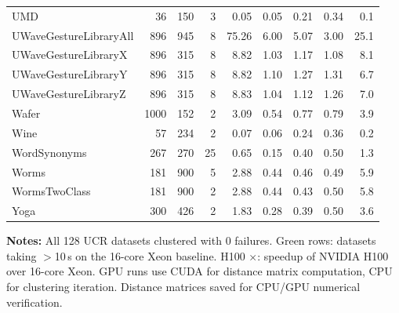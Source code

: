 \documentclass[11pt,landscape]{article}
\begin{document}
\begin{longtable}{lrrrrrrrr}
UMD & 36 & 150 & 3 & 0.05 & 0.05 & 0.21 & 0.34 & 0.1 \\
\rowcolor{fastrow}UWaveGestureLibraryAll & 896 & 945 & 8 & 75.26 & 6.00 & 5.07 & 3.00 & 25.1 \\
UWaveGestureLibraryX & 896 & 315 & 8 & 8.82 & 1.03 & 1.17 & 1.08 & 8.1 \\
UWaveGestureLibraryY & 896 & 315 & 8 & 8.82 & 1.10 & 1.27 & 1.31 & 6.7 \\
UWaveGestureLibraryZ & 896 & 315 & 8 & 8.83 & 1.04 & 1.12 & 1.26 & 7.0 \\
Wafer & 1000 & 152 & 2 & 3.09 & 0.54 & 0.77 & 0.79 & 3.9 \\
Wine & 57 & 234 & 2 & 0.07 & 0.06 & 0.24 & 0.36 & 0.2 \\
WordSynonyms & 267 & 270 & 25 & 0.65 & 0.15 & 0.40 & 0.50 & 1.3 \\
Worms & 181 & 900 & 5 & 2.88 & 0.44 & 0.46 & 0.49 & 5.9 \\
WormsTwoClass & 181 & 900 & 2 & 2.88 & 0.44 & 0.43 & 0.50 & 5.8 \\
Yoga & 300 & 426 & 2 & 1.83 & 0.28 & 0.39 & 0.50 & 3.6 \\
\end{longtable}

\vspace{6pt}
\noindent\textbf{Notes:} All 128 UCR datasets clustered with 0 failures. Green rows: datasets taking $>$10\,s on the 16-core Xeon baseline. H100 $\times$: speedup of NVIDIA H100 over 16-core Xeon. GPU runs use CUDA for distance matrix computation, CPU for clustering iteration. Distance matrices saved for CPU/GPU numerical verification.
\end{document}

